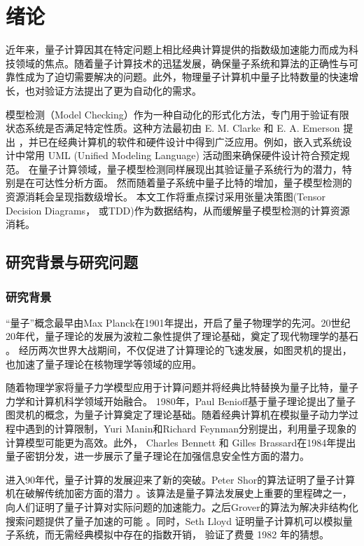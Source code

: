 \chapter{绪论}
近年来，量子计算因其在特定问题上相比经典计算提供的指数级加速能力而成为科技领域的焦点。随着量子计算技术的迅猛发展，确保量子系统和算法的正确性与可靠性成为了迫切需要解决的问题。此外，物理量子计算机中量子比特数量的快速增长，也对验证方法提出了更为自动化的需求。

模型检测（Model Checking）作为一种自动化的形式化方法，专门用于验证有限状态系统是否满足特定性质。这种方法最初由 E. M. Clarke 和 E. A. Emerson 提出
\citep{Emerson_1980,Clarke,Clarke_1986}，并已在经典计算机的软件和硬件设计中得到广泛应用。例如，嵌入式系统设计中常用 UML (Unified Modeling Language) 活动图来确保硬件设计符合预定规范\citep{Grobelna_2015}。
在量子计算领域，量子模型检测同样展现出其验证量子系统行为的潜力，特别是在可达性分析方面。
然而随着量子系统中量子比特的增加，量子模型检测的资源消耗会呈现指数级增长。
本文工作将重点探讨采用张量决策图(Tensor Decision Diagrams， 或TDD)作为数据结构，从而缓解量子模型检测的计算资源消耗。


\section{研究背景与研究问题}
\subsection{研究背景}
“量子”概念最早由Max Planck在1901年提出，开启了量子物理学的先河\citep{planck1901law}。20世纪20年代，量子理论的发展为波粒二象性提供了理论基础，奠定了现代物理学的基石
\citep{bhatta2020plurality}。
经历两次世界大战期间，不仅促进了计算理论的飞速发展，如图灵机的提出\citep{hodges2014alan}，也加速了量子理论在核物理学等领域的应用\citep{maartensson2006manhattan}。

随着物理学家将量子力学模型应用于计算问题并将经典比特替换为量子比特，量子力学和计算机科学领域开始融合。 1980年，Paul Benioff基于量子理论提出了量子图灵机的概念，为量子计算奠定了理论基础\citep{benioff1980computer}。随着经典计算机在模拟量子动力学过程中遇到的计算限制，Yuri Manin和Richard Feynman分别提出，利用量子现象的计算模型可能更为高效\citep{Feynman,manin1980vychislimoe}。此外， Charles Bennett 和 Gilles Brassard在1984年提出量子密钥分发，进一步展示了量子理论在加强信息安全性方面的潜力\citep{bennett2014quantum}。


进入90年代，量子计算的发展迎来了新的突破。Peter Shor的算法证明了量子计算机在破解传统加密方面的潜力\citep{Shor} 。该算法是量子算法发展史上重要的里程碑之一，向人们证明了量子计算对实际问题的加速能力。之后Grover的算法为解决非结构化搜索问题提供了量子加速的可能\citep{Grover_1996} 。同时，Seth Lloyd 证明量子计算机可以模拟量子系统，而无需经典模拟中存在的指数开销\citep{lloyd1996universal}， 验证了费曼 1982 年的猜想\citep{cao2019quantum}。


